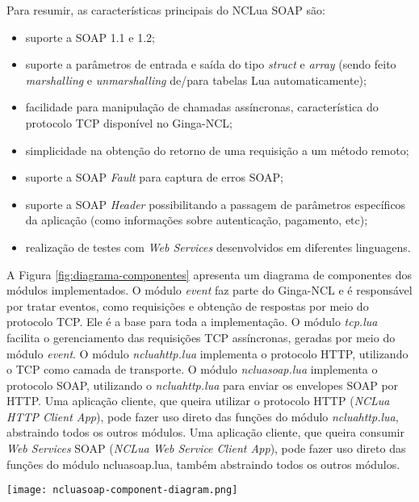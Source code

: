 Para resumir, as características principais do NCLua SOAP são:

\begin{itemize}
  \item suporte a SOAP 1.1 e 1.2;
  \item suporte a parâmetros de entrada e saída do tipo \textit{struct} e \textit{array}
   (sendo feito \textit{marshalling} e \textit{unmarshalling} de/para tabelas Lua automaticamente); 
  \item facilidade para manipulação de chamadas assíncronas, característica do protocolo TCP disponível no Ginga-NCL;
  \item simplicidade na obtenção do retorno de uma requisição a um método remoto;
  \item suporte a SOAP \textit{Fault} para captura de erros SOAP;
  \item suporte a SOAP \textit{Header}\cite{soap-spec} possibilitando a passagem de parâmetros específicos da aplicação 
  (como informações sobre autenticação, pagamento, etc);
	\item realização de testes com \textit{Web Services} desenvolvidos em diferentes linguagens.
\end{itemize}

A Figura \ref{fig:diagrama-componentes} apresenta um diagrama de componentes dos módulos implementados.
O módulo \textit{event} faz parte do Ginga-NCL e é responsável por tratar eventos, como requisições e obtenção de respostas
por meio do protocolo TCP. Ele é a base para toda a implementação. O módulo \textit{tcp.lua} facilita o gerenciamento
das requisições TCP assíncronas, geradas por meio do módulo \textit{event}. O módulo \textit{ncluahttp.lua }
implementa o protocolo HTTP, utilizando o TCP como camada de transporte. O módulo \textit{ncluasoap.lua}
implementa o protocolo SOAP, utilizando o \textit{ncluahttp.lua} para enviar os envelopes SOAP por HTTP.
Uma aplicação cliente, que queira utilizar o protocolo HTTP (\textit{NCLua HTTP Client App}), pode fazer uso direto das funções
do módulo \textit{ncluahttp.lua}, abstraindo todos os outros módulos. 
Uma aplicação cliente, que queira consumir
\textit{Web Services} SOAP (\textit{NCLua Web Service Client App}), 
pode fazer uso direto das funções do módulo ncluasoap.lua, também abstraindo todos os outros módulos.

\begin{center}
	\texttt{[image: ncluasoap-component-diagram.png]}
	\label{fig:diagrama-componentes}
\end{center}

